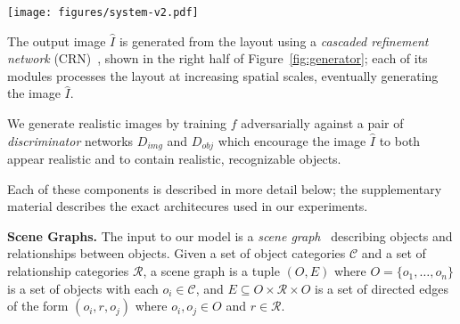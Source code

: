 \documentclass[10pt,twocolumn,letterpaper]{article}
\begin{document}
\begin{figure*}
  \centering
  \texttt{[image: figures/system-v2.pdf]}
  \vspace{-4mm}
  \caption{
    Overview of our image generation network $f$ for generating images from
    scene graphs.
    The input to the model is a \emph{scene graph} specifying objects and relationships;
    it is processed with a \emph{graph convolution network} (Figure~\ref{fig:gconv}) which passes information along
    edges to compute embedding vectors for all objects. These vectors are used to predict
    bounding boxes and segmentation masks for objects, which are combined to form a
    \emph{scene layout} (Figure~\ref{fig:layout}). The layout is converted to an image using a \emph{cascaded refinement network}
    (CRN)~\cite{chen2017photographic}. The model is trained adversarially against a pair of
    \emph{discriminator networks}.
    During training the model observes ground-truth object bounding boxes and (optionally) segmentation masks, but these are predicted by the model at test-time.
  }
  \vspace{-2mm}
  \label{fig:generator}
\end{figure*}

The output image $\hat I$ is generated from the layout using a
\emph{cascaded refinement network} (CRN)~\cite{chen2017photographic}, shown in the
right half of Figure~\ref{fig:generator}; each of its modules processes the layout
at increasing spatial scales, eventually generating the image $\hat I$.

We generate realistic images by training $f$ adversarially against a
pair of \emph{discriminator} networks $D_{img}$ and $D_{obj}$ which encourage
the image $\hat I$ to both appear realistic and to contain realistic, recognizable
objects.

Each of these components is described in more detail below; the supplementary
material describes the exact architecures used in our experiments.

\textbf{Scene Graphs.}
The input to our model is a \emph{scene graph}~\cite{johnson2015image}
describing objects and relationships between objects.
Given a set of object categories $\mathcal{C}$ and a set of relationship
categories $\mathcal{R}$, a scene graph is a tuple $(O, E)$ where
$O=\{o_1, \ldots, o_n\}$ is a set of objects with each $o_i\in\mathcal{C}$,
and $E\subseteq O\times\mathcal{R}\times O$ is a set of directed edges of
the form $(o_i, r, o_j)$ where $o_i,o_j\in O$ and $r\in\mathcal{R}$.
\end{document}
